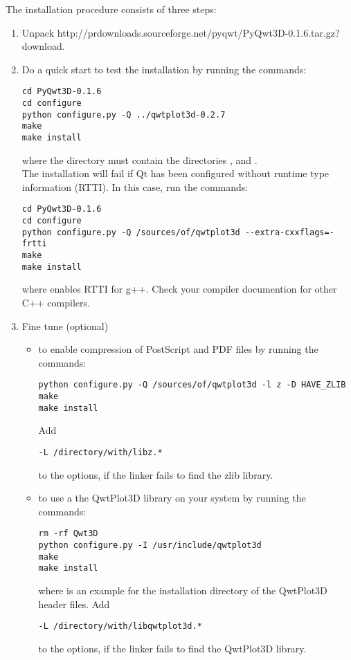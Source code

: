 \documentclass{manual}
\newcommand{\PyQwtDddTarGz}{\ulink{PyQwt3D-0.1.6.tar.gz}
  {http://prdownloads.sourceforge.net/pyqwt/PyQwt3D-0.1.6.tar.gz?download}}
\newcommand{\Future}{
  \begin{notice}[warning]
    The documentation is for the future PyQwt3D-0.1.6 which has not yet been
    released.  Please refer, to the documentation in the release that you are
    using.
  \end{notice}
}
\renewcommand{\Future}{}
\begin{document}
\Future{}

The installation procedure consists of three steps:
\begin{enumerate}
\item
  Unpack \PyQwtDddTarGz{}.
\item
  Do a quick start to test the installation by running the commands:
\begin{verbatim}
cd PyQwt3D-0.1.6
cd configure
python configure.py -Q ../qwtplot3d-0.2.7
make
make install
\end{verbatim}
  where the directory
   must contain the directories ,
   and .\\
  The installation will fail if Qt has been configured without runtime type
  information (RTTI).  In this case, run the commands:
\begin{verbatim}
cd PyQwt3D-0.1.6
cd configure
python configure.py -Q /sources/of/qwtplot3d --extra-cxxflags=-frtti
make
make install
\end{verbatim}
  where  enables RTTI for g++.  Check your compiler documention
  for other C++ compilers.
\item
  Fine tune (optional)
  \begin{itemize}
    \item
      to enable compression of PostScript and PDF files by running the
      commands:
\begin{verbatim}
python configure.py -Q /sources/of/qwtplot3d -l z -D HAVE_ZLIB
make
make install
\end{verbatim}
      Add
\begin{verbatim}
-L /directory/with/libz.*
\end{verbatim}
      to the  options, if the linker fails to find the zlib
      library.
    \item
      to use a the QwtPlot3D library on your system by running the commands:
\begin{verbatim}
rm -rf Qwt3D
python configure.py -I /usr/include/qwtplot3d
make
make install
\end{verbatim}
      where  is an example for the installation
      directory of the QwtPlot3D header files.
      Add
\begin{verbatim}
-L /directory/with/libqwtplot3d.*
\end{verbatim}
      to the  options, if the linker fails to find the
      QwtPlot3D library.
  \end{itemize}
\end{enumerate}
\end{document}

